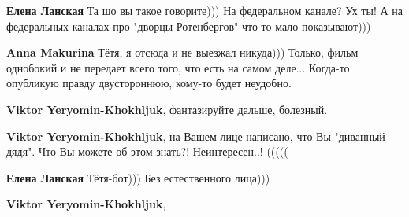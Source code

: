 \begin{itemize}
\begin{itemize}
 
\textbf{Елена Ланская}
Та шо вы такое говорите))) На федеральном канале? Ух ты!
А на федеральных каналах про "дворцы Ротенбергов" что-то мало показывают)))

 
\textbf{Anna Makurina}
Тётя, я отсюда и не выезжал никуда)))
Только, фильм однобокий и не передает всего того, что есть на самом деле...
Когда-то опубликую правду двустороннюю, кому-то будет неудобно.

 
\textbf{Viktor Yeryomin-Khokhljuk}, фантазируйте дальше, болезный.

 
\textbf{Viktor Yeryomin-Khokhljuk}, на Вашем лице написано, что Вы "диванный дядя". Что Вы можете об этом знать?! Неинтересен..! (((((

 
\textbf{Елена Ланская}
Тётя-бот))) Без естественного лица)))

 
\textbf{Viktor Yeryomin-Khokhljuk}, 


\end{itemize}
\end{itemize}
